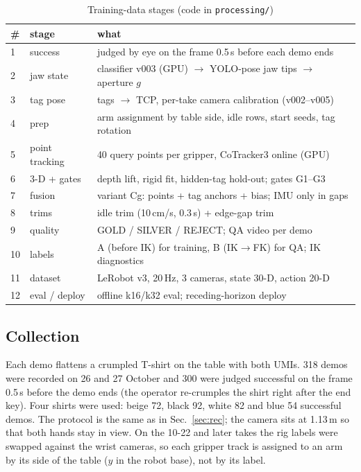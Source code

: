 \documentclass[conference,10pt]{IEEEtran}
\begin{document}
\begin{table}[t]
\caption{Training-data stages (code in \texttt{processing/})}\label{tab:stages}
\centering\scriptsize
\begin{tabular}{@{}p{}p{}p{}@{}}
\toprule
\# & stage & what \\
\midrule
1 & success & judged by eye on the frame 0.5\,s before each demo ends \\
2 & jaw state & classifier v003 (GPU) $\to$ YOLO-pose jaw tips $\to$ aperture $g$ \\
3 & tag pose & tags $\to$ TCP, per-take camera calibration (v002--v005) \\
4 & prep & arm assignment by table side, idle rows, start seeds, tag rotation \\
5 & point tracking & 40 query points per gripper, CoTracker3 online (GPU) \\
6 & 3-D + gates & depth lift, rigid fit, hidden-tag hold-out; gates G1--G3 \\
7 & fusion & variant Cg: points + tag anchors + bias; IMU only in gaps \\
8 & trims & idle trim (10\,cm/s, 0.3\,s) + edge-gap trim \\
9 & quality & GOLD / SILVER / REJECT; QA video per demo \\
10 & labels & A (before IK) for training, B (IK$\to$FK) for QA; IK diagnostics \\
11 & dataset & LeRobot v3, 20\,Hz, 3 cameras, state 30-D, action 20-D \\
12 & eval / deploy & offline k16/k32 eval; receding-horizon deploy \\
\bottomrule
\end{tabular}
\end{table}

\subsection{Collection}\label{sec:traincoll}
Each demo flattens a crumpled T-shirt on the table with both UMIs. 318 demos were recorded on 26 and 27 October and 300
were judged successful on the frame 0.5\,s before the demo ends (the operator re-crumples the shirt right after the end
key). Four shirts were used: beige 72, black 92, white 82 and blue 54 successful demos. The protocol is the same as in
Sec.~\ref{sec:rec}; the camera sits at 1.13\,m so that both hands stay in view. On the 10-22 and later takes the rig labels
were swapped against the wrist cameras, so each gripper track is assigned to an arm by its side of the table ($y$ in the
robot base), not by its label.
\end{document}
